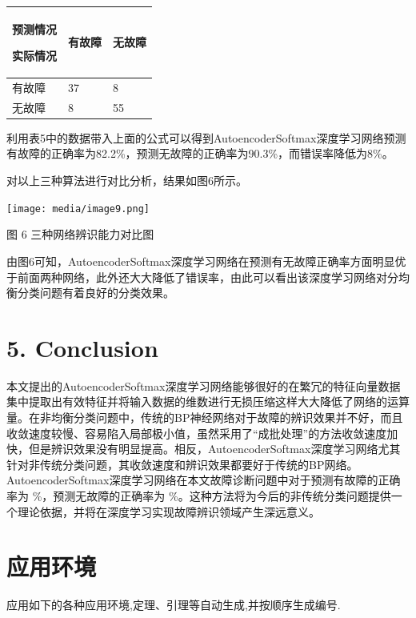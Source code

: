 \documentclass{ctacn}%
\begin{document}
\begin{multicols}{2}
\begin{longtable}[c]{@{}lll@{}}
\toprule
预测情况

实际情况 & 有故障 & 无故障\tabularnewline
\midrule
\endhead
有故障 & 37 & 8\tabularnewline
无故障 & 8 & 55\tabularnewline
\bottomrule
\end{longtable}

利用表5中的数据带入上面的公式可以得到AutoencoderSoftmax深度学习网络预测有故障的正确率为82.2\%，预测无故障的正确率为90.3\%，而错误率降低为8\%。

对以上三种算法进行对比分析，结果如图6所示。

\texttt{[image: media/image9.png]}

图 6 三种网络辨识能力对比图

由图6可知，AutoencoderSoftmax深度学习网络在预测有无故障正确率方面明显优于前面两种网络，此外还大大降低了错误率，由此可以看出该深度学习网络对分均衡分类问题有着良好的分类效果。

\section{5. Conclusion }\label{conclusion}

本文提出的AutoencoderSoftmax深度学习网络能够很好的在繁冗的特征向量数据集中提取出有效特征并将输入数据的维数进行无损压缩这样大大降低了网络的运算量。在非均衡分类问题中，传统的BP神经网络对于故障的辨识效果并不好，而且收敛速度较慢、容易陷入局部极小值，虽然采用了``成批处理''的方法收敛速度加快，但是辨识效果没有明显提高。相反，AutoencoderSoftmax深度学习网络尤其针对非传统分类问题，其收敛速度和辨识效果都要好于传统的BP网络。AutoencoderSoftmax深度学习网络在本文故障诊断问题中对于预测有故障的正确率为
\%，预测无故障的正确率为
\%。这种方法将为今后的非传统分类问题提供一个理论依据，并将在深度学习实现故障辨识领域产生深远意义。



\section{应用环境}
应用如下的各种应用环境,定理、引理等自动生成,并按顺序生成编号.





\end{multicols}
\end{document}
